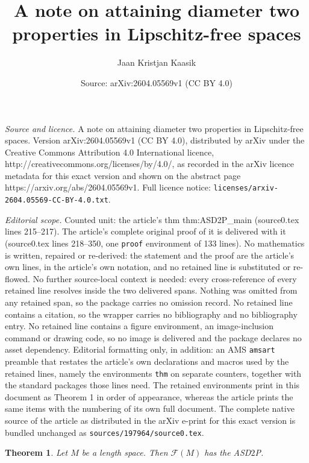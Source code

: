 \documentclass[10pt,a4paper]{amsart}
\title{A note on attaining diameter two properties in Lipschitz-free spaces}
\author{Jaan Kristjan Kaasik}
\date{Source: arXiv:2604.05569v1 (CC BY 4.0)}
\newtheorem{thm}{Theorem}
\begin{document}
\maketitle

\noindent\emph{Source and licence.} A note on attaining diameter two properties in Lipschitz-free spaces. Version arXiv:2604.05569v1 (CC BY 4.0), distributed by arXiv under the Creative Commons Attribution 4.0 International licence, http://creativecommons.org/licenses/by/4.0/, as recorded in the arXiv licence metadata for this exact version and shown on the abstract page https://arxiv.org/abs/2604.05569v1. Full licence notice: \texttt{licenses/arxiv-2604.05569-CC-BY-4.0.txt}.\par\smallskip

\noindent\textit{Editorial scope.} Counted unit: the article's thm thm:ASD2P\_main (source0.tex lines 215--217). The article's complete original proof of it is delivered with it (source0.tex lines 218--350, one \texttt{proof} environment of 133 lines). No mathematics is written, repaired or re-derived: the statement and the proof are the article's own lines, in the article's own notation, and no retained line is substituted or re-flowed.  No further source-local context is needed: every cross-reference of every retained line resolves inside the two delivered spans.  Nothing was omitted from any retained span, so the package carries no omission record.  No retained line contains a citation, so the wrapper carries no bibliography and no bibliography entry.  No retained line contains a figure environment, an image-inclusion command or drawing code, so no image is delivered and the package declares no asset dependency.  Editorial formatting only, in addition: an AMS \texttt{amsart} preamble that restates the article's own declarations and macros used by the retained lines, namely the environments \texttt{thm} on separate counters, together with the standard packages those lines need.  The retained environments print in this document as Theorem 1 in order of appearance, whereas the article prints the same items with the numbering of its own full document.  The complete native source of the article as distributed in the arXiv e-print for this exact version is bundled unchanged as \texttt{sources/197964/source0.tex}.
\begin{thm}\label{thm:ASD2P_main}
    Let $M$ be a length space. Then $\mathcal{F}(M)$ has the ASD$2$P. 
\end{thm}
\end{document}
